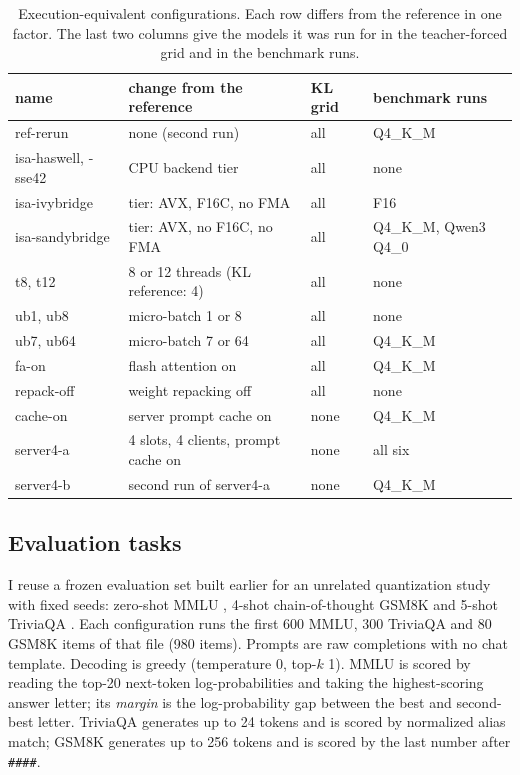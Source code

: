 \begin{table}[t]
\centering\small
\caption{Execution-equivalent configurations. Each row differs from the reference in one
factor. The last two columns give the models it was run for in the teacher-forced grid and in
the benchmark runs.}
\label{tab:configs}
\begin{tabular}{llll}
\toprule
name & change from the reference & KL grid & benchmark runs\\
\midrule
ref-rerun & none (second run) & all & Q4\_K\_M\\
isa-haswell, -sse42 & CPU backend tier & all & none\\
isa-ivybridge & tier: AVX, F16C, no FMA & all & F16\\
isa-sandybridge & tier: AVX, no F16C, no FMA & all & Q4\_K\_M, Qwen3 Q4\_0\\
t8, t12 & 8 or 12 threads (KL reference: 4) & all & none\\
ub1, ub8 & micro-batch 1 or 8 & all & none\\
ub7, ub64 & micro-batch 7 or 64 & all & Q4\_K\_M\\
fa-on & flash attention on & all & Q4\_K\_M\\
repack-off & weight repacking off & all & none\\
cache-on & server prompt cache on & none & Q4\_K\_M\\
server4-a & 4 slots, 4 clients, prompt cache on & none & all six\\
server4-b & second run of server4-a & none & Q4\_K\_M\\
\bottomrule
\end{tabular}
\end{table}

\subsection{Evaluation tasks}
I reuse a frozen evaluation set built earlier for an unrelated quantization study with fixed
seeds: zero-shot MMLU \citep{hendrycks2021}, 4-shot chain-of-thought GSM8K \citep{cobbe2021} and
5-shot TriviaQA \citep{joshi2017}. Each configuration runs the first 600 MMLU, 300 TriviaQA and
80 GSM8K items of that file (980 items). Prompts are raw completions with no chat template.
Decoding is greedy (temperature 0, top-$k$ 1). MMLU is scored by reading the top-20 next-token
log-probabilities and taking the highest-scoring answer letter; its \emph{margin} is the
log-probability gap between the best and second-best letter. TriviaQA generates up to 24 tokens
and is scored by normalized alias match; GSM8K generates up to 256 tokens and is scored by the
last number after \texttt{\#\#\#\#}.

